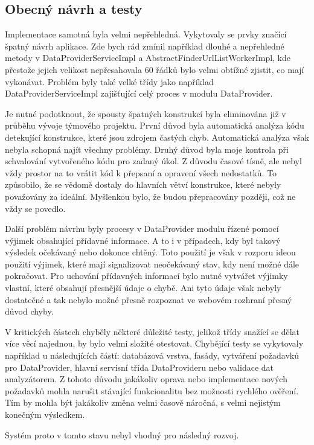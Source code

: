 \documentclass[thesis=B,czech]{FITthesis}[2012/06/26]
\begin{document}
\subsection{Obecný návrh a testy}\label{ch:architecture-tests}
Implementace samotná byla velmi nepřehledná. Vykytovaly se prvky značící špatný návrh aplikace.
Zde bych rád zmínil například dlouhé a nepřehledné metody v
DataProviderServiceImpl a AbstractFinderUrlListWorkerImpl, kde přestože jejich velikost 
nepřesahovala 60 řádků bylo velmi obtížné zjistit, co mají vykonávat. Problém byly také velké třídy
jako například DataProviderServiceImpl zajišťující celý proces v modulu DataProvider.
\par
Je nutné podotknout, že spousty špatných konstrukcí byla eliminována již v průběhu vývoje týmového projektu.
První důvod byla automatická analýza kódu detekující konstrukce, které jsou zdrojem častých chyb. Automatická analýza
však nebyla schopná najít všechny problémy. Druhý důvod byla moje kontrola při schvalování vytvořeného kódu pro 
zadaný úkol. Z důvodu časové tísně, ale nebyl vždy prostor na to vrátit kód k přepsaní a opravení všech nedostatků. To způsobilo, že
se vědomě dostaly do hlavních větví konstrukce, které nebyly považovány za ideální. Myšlenkou bylo, že budou přepracovány později, což ne vždy se povedlo.
\par
Další problém návrhu byly procesy v DataProvider modulu řízené pomocí výjimek obsahující 
přídavné informace. A to i v případech, kdy byl takový výsledek očekávaný nebo dokonce chtěný. 
Toto použití je však v rozporu ideou použití výjimek, které mají signalizovat neočekávaný stav, kdy není možné dále pokračovat.\cite{exception}
Pro uchování přídavných informací bylo nutné vytvářet výjimky vlastní, které obsahují přesnější údaje o chybě. Ani tyto údaje však nebyly 
dostatečné a tak nebylo možné přesně rozpoznat ve webovém rozhraní přesný důvod chyby.
\par
V kritických částech chyběly některé důležité testy, jelikož třídy snažící se dělat více věcí najednou, by bylo velmi
složité otestovat. Chybějící testy se vykytovaly například u následujících částí: databázová vrstva, fasády, vytváření požadavků pro DataProvider,
hlavní servisní třída DataProvideru nebo validace dat analyzátorem. Z tohoto důvodu jakákoliv oprava nebo implementace nových požadavků 
mohla narušit stávající funkcionalitu bez možnosti rychlého ověření. Tím by mohla být jakákoliv změna velmi časově náročná, s velmi nejistým konečným výsledkem.

Systém proto v tomto stavu nebyl vhodný pro následný rozvoj.
\end{document}
